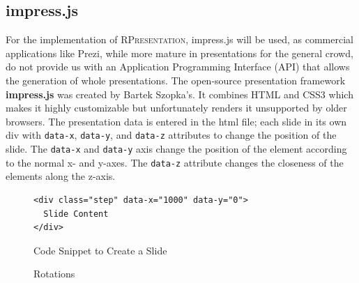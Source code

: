 \documentclass[twoside, 12pt]{article}
\newcommand{\sys}{\textsc{RPresentation}\xspace}
\begin{document}
\subsection{impress.js}
\label{sec:Impressjs}

For the implementation of \sys, impress.js will be used, as commercial applications like Prezi, while more mature in presentations for the general crowd, do not provide us with an Application Programming Interface (API) that allows the generation of whole presentations. The open-source presentation framework \textbf{impress.js} \cite{JSImpress:npentrel14} was created by Bartek Szopka's. It combines HTML and CSS3 which makes it highly customizable but unfortunately renders it unsupported by older browsers. The presentation data is entered in the html file; each slide in its own div with \texttt{data-x}, \texttt{data-y}, and \texttt{data-z} attributes to change the position of the slide. The \texttt{data-x} and \texttt{data-y} axis change the position of the element according to the normal x- and y-axes. The \texttt{data-z} attribute changes the closeness of the elements along the z-axis.\\

\begin{figure}
\vspace{-26pt}
\begin{verbatim}
<div class="step" data-x="1000" data-y="0">
  Slide Content
</div>
\end{verbatim}
\vspace{-5pt}
  \caption{Code Snippet to Create a Slide}
  \label{fig:SSlide}
  \vspace{12pt}
\end{figure}

\begin{figure}
\vspace{-26pt}
  \begin{center}
  \end{center}
\vspace{-20pt}
  \caption{Rotations \cite{Rotations:npentrel14}}
  \label{fig:Rotate}
\vspace{-10pt}
\end{figure}
\end{document}
